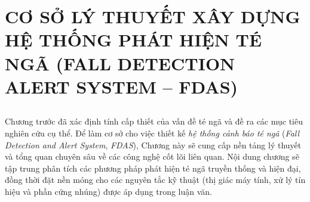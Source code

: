 
\chapter[ CƠ SỞ LÝ THUYẾT HỆ THỐNG FDAS ]%
        { CƠ SỞ LÝ THUYẾT XÂY DỰNG HỆ THỐNG PHÁT HIỆN TÉ NGÃ (FALL DETECTION ALERT SYSTEM – FDAS) }
\label{chap:theory}
\label{chap:theoretical_basis}

\section*{} %

Chương trước đã xác định tính cấp thiết của vấn đề té ngã và đề ra các mục tiêu nghiên cứu cụ thể.  
Để làm cơ sở cho việc thiết kế \emph{hệ thống cảnh báo té ngã} (\emph{Fall Detection and Alert System}, \emph{FDAS}), Chương này sẽ cung cấp nền tảng lý thuyết và tổng quan chuyên sâu về các công nghệ cốt lõi liên quan.  
Nội dung chương sẽ tập trung phân tích các phương pháp phát hiện té ngã truyền thống và hiện đại, đồng thời đặt nền móng cho các nguyên tắc kỹ thuật (thị giác máy tính, xử lý tín hiệu và phần cứng nhúng) được áp dụng trong luận văn.






